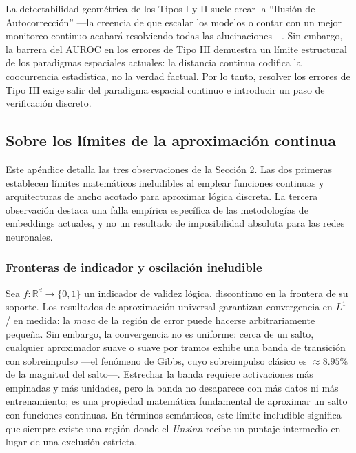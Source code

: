 \documentclass{article}
\begin{document}
La detectabilidad geométrica de los Tipos I y II suele crear la
``Ilusión de Autocorrección'' \citep{symcode2025} ---la creencia de que
escalar los modelos o contar con un mejor monitoreo continuo acabará
resolviendo todas las alucinaciones---. Sin embargo, la barrera del
AUROC en los errores de Tipo III demuestra un límite estructural de los
paradigmas espaciales actuales: la distancia continua codifica la
coocurrencia estadística, no la verdad factual. Por lo tanto, resolver
los errores de Tipo III exige salir del paradigma espacial continuo e
introducir un paso de verificación discreto.

\hypertarget{sobre-los-luxedmites-de-la-aproximaciuxf3n-continua}{%
\subsection{\texorpdfstring{Sobre los límites de la aproximación
continua
\label{app:continuous}}{Sobre los límites de la aproximación continua }}\label{sobre-los-luxedmites-de-la-aproximaciuxf3n-continua}}

Este apéndice detalla las tres observaciones de la Sección 2. Las dos
primeras establecen límites matemáticos ineludibles al emplear funciones
continuas y arquitecturas de ancho acotado para aproximar lógica
discreta. La tercera observación destaca una falla empírica específica
de las metodologías de embeddings actuales, y no un resultado de
imposibilidad absoluta para las redes neuronales.

\hypertarget{fronteras-de-indicador-y-oscilaciuxf3n-ineludible}{%
\subsubsection{Fronteras de indicador y oscilación
ineludible}\label{fronteras-de-indicador-y-oscilaciuxf3n-ineludible}}

Sea \(f: \mathbb{R}^d \to \{0,1\}\) un indicador de validez lógica,
discontinuo en la frontera de su soporte. Los resultados de aproximación
universal \citep{hornik1991approximation} garantizan convergencia en
\(L^1\) / en medida: la \emph{masa} de la región de error puede hacerse
arbitrariamente pequeña. Sin embargo, la convergencia no es uniforme:
cerca de un salto, cualquier aproximador suave o suave por tramos exhibe
una banda de transición con sobreimpulso ---el fenómeno de Gibbs, cuyo
sobreimpulso clásico es \(\approx 8.95\%\) de la magnitud del salto---.
Estrechar la banda requiere activaciones más empinadas y más unidades,
pero la banda no desaparece con más datos ni más entrenamiento; es una
propiedad matemática fundamental de aproximar un salto con funciones
continuas. En términos semánticos, este límite ineludible significa que
siempre existe una región donde el \emph{Unsinn} recibe un puntaje
intermedio en lugar de una exclusión estricta.
\end{document}
